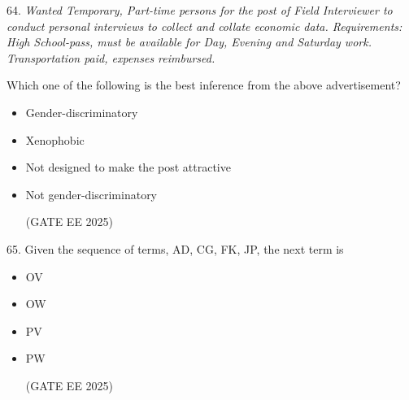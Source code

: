 \documentclass[twocolumn]{article}
\begin{document}
64. \textit{Wanted Temporary, Part-time persons for the post of Field Interviewer to conduct personal interviews to collect and collate economic data. Requirements: High School-pass, must be available for Day, Evening and Saturday work. Transportation paid, expenses reimbursed.}


Which one of the following is the best inference from the above advertisement?
\begin{itemize}
\item[(A)] Gender-discriminatory

\item[(B)] Xenophobic

\item[(C)] Not designed to make the post attractive

\item[(D)] Not gender-discriminatory

(GATE EE 2025)
  \end{itemize}




65. Given the sequence of terms, AD, CG, FK, JP, the next term is

\begin{itemize}
\item[(A)] OV

\item[(B)] OW

\item[(C)] PV

\item[(D)] PW

(GATE EE 2025)
  \end{itemize}





\end{document}
